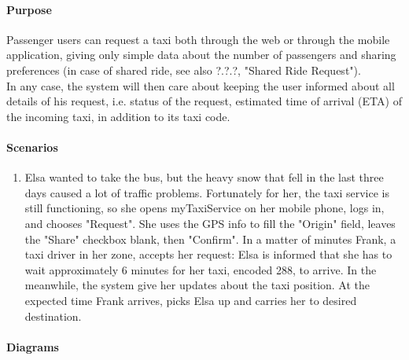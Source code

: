 \paragraph{Purpose}

Passenger users can request a taxi both through the web or through the mobile application, giving only simple data about the number of passengers and sharing preferences (in case of shared ride, see also ?.?.?, "Shared Ride Request").\\
In any case, the system will then care about keeping the user informed about all details of his request, i.e. status of the request, estimated time of arrival (ETA) of the incoming taxi, in addition to its taxi code.

\paragraph{Scenarios}
\begin{enumerate}
	\item Elsa wanted to take the bus, but the heavy snow that fell in the last three days caused a lot of traffic problems. Fortunately for her, the taxi service is still functioning, so she opens myTaxiService on her mobile phone, logs in, and chooses "Request".
	She uses the GPS info to fill the "Origin" field, leaves the "Share" checkbox blank, then "Confirm". In a matter of minutes Frank, a taxi driver in her zone, accepts her request: Elsa is informed that she has to wait approximately 6 minutes for her taxi, encoded 288, to arrive. In the meanwhile, the system give her updates about the taxi position. At the expected time Frank arrives, picks Elsa up and carries her to desired destination.
\end{enumerate}

\paragraph{Diagrams}

